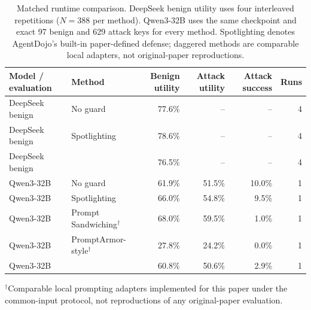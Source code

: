 \begin{table}[t]
\centering
\small
\setlength{\tabcolsep}{5pt}
\caption{Matched runtime comparison. DeepSeek benign utility uses four interleaved repetitions ($N=388$ per method). Qwen3-32B uses the same checkpoint and exact 97 benign and 629 attack keys for every method. Spotlighting denotes AgentDojo's built-in paper-defined defense; daggered methods are comparable local adapters, not original-paper reproductions.}
\label{tab:final-matched-validation}
\begin{tabular}{llrrrr}
\toprule
Model / evaluation & Method & Benign utility & Attack utility & Attack success & Runs \\
\midrule
DeepSeek benign & No guard & 77.6\% & -- & -- & 4 \\
DeepSeek benign & Spotlighting & 78.6\% & -- & -- & 4 \\
DeepSeek benign & \sys{} & 76.5\% & -- & -- & 4 \\
\midrule
Qwen3-32B & No guard & 61.9\% & 51.5\% & 10.0\% & 1 \\
Qwen3-32B & Spotlighting & 66.0\% & 54.8\% & 9.5\% & 1 \\
Qwen3-32B & Prompt Sandwiching$^{\dagger}$ & 68.0\% & 59.5\% & 1.0\% & 1 \\
Qwen3-32B & PromptArmor-style$^{\dagger}$ & 27.8\% & 24.2\% & 0.0\% & 1 \\
Qwen3-32B & \sys{} & 60.8\% & 50.6\% & 2.9\% & 1 \\
\bottomrule
\end{tabular}
\vspace{2pt}\parbox{\textwidth}{\footnotesize $^{\dagger}$Comparable local prompting adapters implemented for this paper under the common-input protocol, not reproductions of any original-paper evaluation.}
\end{table}
